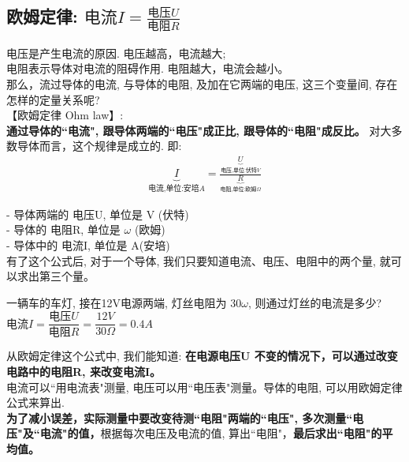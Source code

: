\documentclass[UTF8]{ctexart}
\begin{document}
\vspace{1em} 
	
	
	\subsection{欧姆定律: $\text{电流}I=\frac{\text{电压}U}{\text{电阻}R}	$}
	
	电压是产生电流的原因. 电压越高，电流越大; \\
	电阻表示导体对电流的阻碍作用. 电阻越大，电流会越小。 \\
	那么，流过导体的电流, 与导体的电阻, 及加在它两端的电压, 这三个变量间, 存在怎样的定量关系呢? \\
	
	
	【欧姆定律  Ohm law】: \\
	\textbf{通过导体的``电流", 跟导体两端的``电压"成正比, 跟导体的``电阻"成反比。} 对大多数导体而言，这个规律是成立的. 即: 
	\begin{align*}
		\boxed{
		\underset{\text{电流,单位:安培}A}{\underbrace{I}}=\frac{\underset{\text{电压,单位:伏特}V}{\underbrace{U}}}{\underset{\text{电阻,单位:欧姆}\varOmega}{\underbrace{R}}}			
		}
	\end{align*} 
	
	- 导体两端的 电压U, 单位是 V (伏特) \\
	- 导体的 电阻R, 单位是 $\omega$ (欧姆) \\
	- 导体中的 电流I, 单位是 A(安培) \\
	
	有了这个公式后, 对于一个导体, 我们只要知道电流、电压、电阻中的两个量, 就可以求出第三个量。 \\	
	
	\begin{tcolorbox}[title = {例},boxrule={0.1em},colframe={black!10}, colback={black!3},colbacktitle={black!10},coltitle={black}]
 		一辆车的车灯, 接在12V电源两端, 灯丝电阻为 $30 \omega$, 则通过灯丝的电流是多少? \\
 		$\text{电流}I=\dfrac{\text{电压}U}{\text{电阻}R}=\dfrac{12V}{30\varOmega}=0.4A$ 			
	\end{tcolorbox}
	
	从欧姆定律这个公式中, 我们能知道: \textbf{在电源电压U 不变的情况下，可以通过改变电路中的电阻R, 来改变电流I。} \\
	
	
	电流可以``用电流表"测量, 电压可以用``电压表"测量。导体的电阻, 可以用欧姆定律公式来算出. \\	
	\textbf{为了减小误差，实际测量中要改变待测``电阻"两端的``电压", 多次测量``电压"及``电流"的值，}根据每次电压及电流的值, 算出``电阻"，\textbf{最后求出``电阻"的平均值。} \\
	
\end{document}
